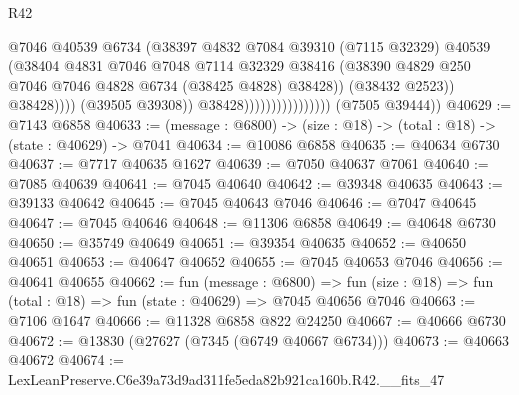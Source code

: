 \begin{lexlean}{R42}
\begin{coremodule}
{                                                @7046
                                                @40539
                                                @6734
                                                (@38397
                                                  @4832
                                                  @7084
                                                  @39310
                                                  (@7115 @32329)
                                                  @40539
                                                  (@38404
                                                    @4831
                                                    @7046
                                                    @7048
                                                    @7114
                                                    @32329
                                                    @38416
                                                    (@38390
                                                      @4829
                                                      @250
                                                      @7046
                                                      @7046
                                                      @4828
                                                      @6734
                                                      (@38425 @4828)
                                                      @38428))
                                                  (@38432 @2523))
                                                @38428))))
                                        (@39505 @39308))
                                      @38428))))))))))))))))
      (@7505 @39444))
@40629 := @7143 @6858
@40633 := (message : @6800) -> (size : @18) -> (total : @18) -> (state : @40629) -> @7041
@40634 := @10086 @6858
@40635 := @40634 @6730
@40637 := @7717 @40635 @1627
@40639 := @7050 @40637 @7061
@40640 := @7085 @40639
@40641 := @7045 @40640
@40642 := @39348 @40635
@40643 := @39133 @40642
@40645 := @7045 @40643 @7046
@40646 := @7047 @40645
@40647 := @7045 @40646
@40648 := @11306 @6858
@40649 := @40648 @6730
@40650 := @35749 @40649
@40651 := @39354 @40635
@40652 := @40650 @40651
@40653 := @40647 @40652
@40655 := @7045 @40653 @7046
@40656 := @40641 @40655
@40662 := fun (message : @6800) =>
  fun (size : @18) => fun (total : @18) => fun (state : @40629) => @7045 @40656 @7046
@40663 := @7106 @1647
@40666 := @11328 @6858 @822 @24250
@40667 := @40666 @6730
@40672 := @13830 (@27627 (@7345 (@6749 @40667 @6734)))
@40673 := @40663 @40672
@40674 := LexLeanPreserve.C6e39a73d9ad311fe5eda82b921ca160b.R42.__fits_47
}
\end{coremodule}
\end{lexlean}
